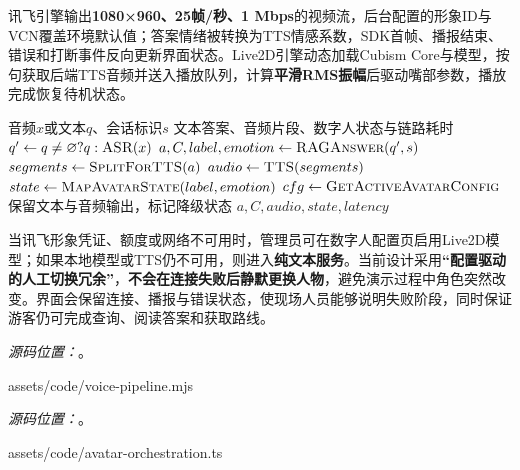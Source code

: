 讯飞引擎输出\textbf{1080×960、25帧/秒、1 Mbps}的视频流，后台配置的形象ID与VCN覆盖环境默认值；答案情绪被转换为TTS情感系数，SDK首帧、播报结束、错误和打断事件反向更新界面状态。Live2D引擎动态加载Cubism Core与模型，按句获取后端TTS音频并送入播放队列，计算\textbf{平滑RMS振幅}后驱动嘴部参数，播放完成恢复待机状态。

\begin{algorithm}[H]
  \caption{语音问答与数字人表达编排算法}\label{alg:voice-avatar}
  \begin{algorithmic}[1]
    \Require 音频$x$或文本$q$、会话标识$s$
    \Ensure 文本答案、音频片段、数字人状态与链路耗时
    \State $q' \gets q\neq\varnothing ? q : \Call{ASR}{x}$ 
    \State $a,C,label,emotion \gets \Call{RAGAnswer}{q',s}$ 
    \State $segments \gets \Call{SplitForTTS}{a}$ 
    \State $audio \gets \Call{TTS}{segments}$ 
    \State $state \gets \Call{MapAvatarState}{label,emotion}$ 
    \State $cfg \gets \Call{GetActiveAvatarConfig}{}$ 
      \State {} 
      \State {} 
    \Else
      \State 保留文本与音频输出，标记降级状态 
    \EndIf
    \State \Return $a,C,audio,state,latency$
  \end{algorithmic}
\end{algorithm}

当讯飞形象凭证、额度或网络不可用时，管理员可在数字人配置页启用Live2D模型；如果本地模型或TTS仍不可用，则进入\textbf{纯文本服务}。当前设计采用\textbf{“配置驱动的人工切换冗余”}，\textbf{不会在连接失败后静默更换人物}，避免演示过程中角色突然改变。界面会保留连接、播报与错误状态，使现场人员能够说明失败阶段，同时保证游客仍可完成查询、阅读答案和获取路线。

\newpage
\noindent\textit{源码位置：}。

  {assets/code/voice-pipeline.mjs}

\newpage
\noindent\textit{源码位置：}。

  {assets/code/avatar-orchestration.ts}

